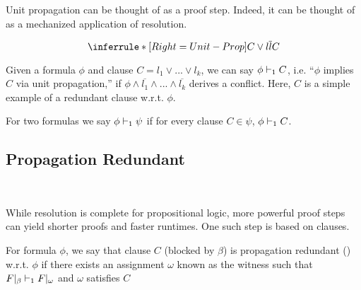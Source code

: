 Unit propagation can be thought of as a proof step. Indeed, it can be thought of as a mechanized application of resolution.

\begin{equation*}
    \inferrule*[Right=Unit-Prop]{
        C \lor l \\ \overline{l}
    }{
        C
    }
\end{equation*}

Given a formula $\phi$ and clause $C = l_1 \lor ... \lor l_k$, we can say $\phi \vdash_1 C$, i.e. ``$\phi$ implies $C$ via unit propagation,'' if $\phi \land \overline{l_1} \land ... \land \overline{l_k}$ derives a conflict. Here, $C$ is a simple example of a redundant clause w.r.t. $\phi$. 








For two formulas we say $\phi \vdash_1 \psi$ if for every clause $C \in \psi$, $\phi \vdash_1 C$. 


\subsection{Propagation Redundant}~\label{subsec:pr}

While resolution is complete for propositional logic, more powerful proof steps can yield shorter proofs and faster runtimes. One such step is based on \pr clauses.

\begin{definition}
    For formula $\phi$, we say that clause $C$ (blocked by $\beta$) is propagation redundant (\pr) w.r.t. $\phi$ if there exists an assignment $\omega$ known as the witness such that $F|_\beta \vdash_1 F|_\omega$ and $\omega$ satisfies $C$
\end{definition}

